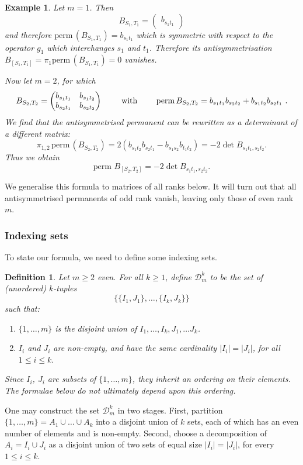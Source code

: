 \documentclass[10pt]{amsart}
\newcommand{\perm}{\mathrm{perm}\,}
\theoremstyle{plain}
\newtheorem{defn}[thm]{Definition}
\newtheorem{ex}[thm]{Example}
\newcommand{\0}{\color{blue}{\mathsf{0}}}
\begin{document}
\begin{ex}\label{N12ex} Let $m=1$. Then 
\[ B_{S_1,T_1} = \begin{pmatrix} b_{s_1t_1} \end{pmatrix}  \]
and therefore  $\perm(B_{S_1,T_1})  = b_{s_1t_1}$ which is symmetric with respect to the operator $g_1$ which interchanges $s_1$ and $t_1$.
Therefore its antisymmetrisation
$ B_{[S_1,T_1]}=\pi_1 \perm(B_{S_1,T_1})=0  $
vanishes. 

Now let $m=2$, for which
\[B_{S_2,T_2} = \begin{pmatrix} b_{s_1t_1} & b_{s_1t_2} \\ b_{s_2t_1} & b_{s_2t_2} \end{pmatrix} \qquad \hbox{ with } \qquad \perm B_{S_2,T_2}  =  b_{s_1t_1}b_{s_2t_2} + b_{s_1t_2}b_{s_2t_1}\ . \]
We find  that the antisymmetrised permanent can be rewritten as a  determinant of  a different matrix:
$$
\pi_{1,2}   \, \perm(B_{S_2,T_2}) =  2 \left(  b_{s_1t_2} b_{s_2t_1} - b_{s_1s_2} b_{t_1t_2} \right)= -  2 \det B_{s_1t_1, s_2t_2}.
$$
 Thus we obtain
 \begin{equation}\label{N2ex}
 \perm\, B_{[S_2,T_2]}=-2 \det B_{s_1t_1, s_2t_2}.
 \end{equation}
\end{ex} 

 We generalise this formula to matrices of all ranks below. It will turn out that all antisymmetrised permanents of odd rank vanish, leaving only those of even rank $m$.
 
 
 \subsubsection{Indexing sets} To state our formula, we need to define some indexing sets. 

\begin{defn}
    Let $m\geq 2$ even. For all $k\geq 1$, define   $\mathcal{D}^k_{m}$ to be the  set of (unordered) $k$-tuples
    \[     \{\{I_1,J_1\} , \ldots, \{ I_k, J_k\} \} \]
    such that: 
    \begin{enumerate}
        \item  $\{1,\ldots,m\}$ is the  disjoint union of $I_1,\ldots, I_k, J_1, \ldots J_k$. 
        \item  $I_i$ and $J_i$ are non-empty, and have the same cardinality $|I_i|=|J_i|$, for all $1\leq i \leq k.$
    \end{enumerate}
   Since $I_i$, $J_i$ are subsets of $\{1,\ldots, m\}$, they inherit an ordering on their elements. The formulae below  do not ultimately depend upon this ordering.
\end{defn}
One may construct the set $\mathcal{D}^k_{m}$ in two stages. First, partition $\{1,\ldots, m\} = A_1 \cup \ldots \cup A_k$ into a disjoint union of $k$ sets, each of which has an even number of elements  and is non-empty. Second, choose a decomposition of $A_i= I_i \cup J_i$ as a disjoint union of two sets of equal size $|I_i|= |J_i|$, for every  $1 \leq i \leq k$.
\end{document}
